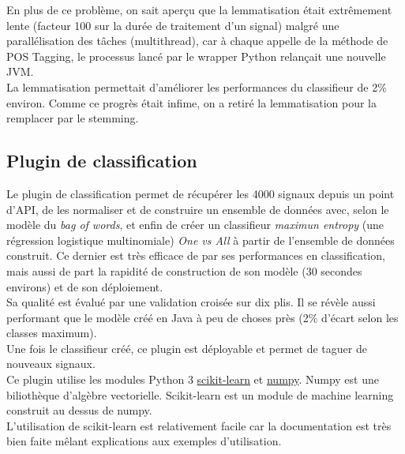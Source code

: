             En plus de ce problème, on sait aperçu que la lemmatisation était extrêmement lente (facteur 100 sur la durée de traitement d'un signal) malgré une parallélisation des tâches (multithread), car à chaque appelle de la méthode de POS Tagging, le processus lancé par le wrapper Python relançait une nouvelle JVM.\\

            La lemmatisation permettait d'améliorer les performances du classifieur de 2\% environ. Comme ce progrès était infime, on a retiré la lemmatisation pour la remplacer par le stemming.


    \subsection{Plugin de classification}
        Le plugin de classification permet de récupérer les 4000 signaux depuis un point d'API, de les normaliser et de construire un ensemble de données avec, selon le modèle du \textit{bag of words}, et enfin de créer un classifieur \textit{maximun entropy} (une régression logistique multinomiale) \textit{One vs All} à partir de l'ensemble de données construit. Ce dernier est très efficace de par ses performances en classification, mais aussi de part la rapidité de construction de son modèle (30 secondes environs) et de son déploiement.\\

        Sa qualité est évalué par une validation croisée sur dix plis. Il se révèle aussi performant que le modèle créé en Java à peu de choses près (2\% d'écart selon les classes maximum).\\

        Une fois le classifieur créé, ce plugin est déployable et permet de taguer de nouveaux signaux.\\

        Ce plugin utilise les modules Python 3 \href{http://scikit-learn.org/stable/}{scikit-learn} et \href{http://www.numpy.org/}{numpy}. Numpy est une biliothèque d'algèbre vectorielle. Scikit-learn est un module de machine learning construit au dessus de numpy.\\
        L'utilisation de scikit-learn est relativement facile car la documentation est très bien faite mêlant explications aux exemples d'utilisation.